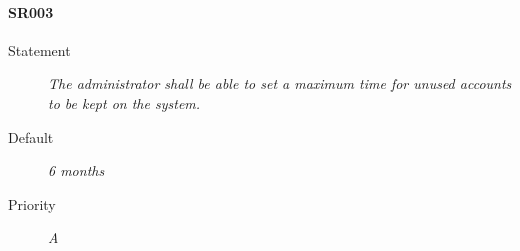 \paragraph{SR003}
  \begin{description}
  \item [Statement] 
    \textit{ The administrator shall be able to set a maximum time for unused accounts to be kept on the system.}
  \item [Default] \textit{6 months}
  \item [Priority] \textit{A}
\end{description}
